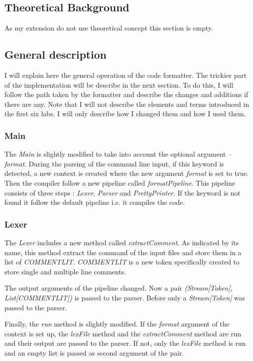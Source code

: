 \subsection{Theoretical Background}
As my extension do not use theoretical concept this section is empty. 



\subsection{General description} 
I will explain here the general operation of the code formatter. The trickier part of the implementation will be describe in the next section. To do this, I will follow the path taken by the formatter and describe the changes and additions if there are any.
Note that I will not describe the elements and terms introduced in the first six labs. I will only describe how I changed them and how I used them.

\subsubsection{Main}
The \emph{Main} is slightly modified to take into account the optional argument \emph{--format}. During the parsing of the command line input, if this keyword is detected, a new context is created where the new argument \emph{format} is set to true. Then the compiler follow a new pipeline called \emph{formatPipeline}. This pipeline consists of three steps : \emph{Lexer}, \emph{Parser} and \emph{PrettyPrinter}. If the keyword is not found it follow the default pipeline i.e. it compiles the code. 

\subsubsection{Lexer}
The \emph{Lexer} includes a new method called \emph{extractComment}. As indicated by its name, this method extract the command of the input files and store them in a list of \emph{COMMENTLIT}. \emph{COMMENTLIT} is a new token specifically created to store single and multiple line comments. 

The output arguments of the pipeline changed. Now a pair \emph{(Stream[Token], List[COMMENTLIT])} is passed to the parser. Before only a \emph{Stream[Token]} was passed to the parser.

Finally, the \emph{run} method is slightly modified. If the \emph{format} argument of the context is set up, the \emph{lexFile} method and the \emph{extractComment} method are run and their output are passed to the parser. If not, only the \emph{lexFile} method is run and an empty list is passed as second argument of the pair. 


